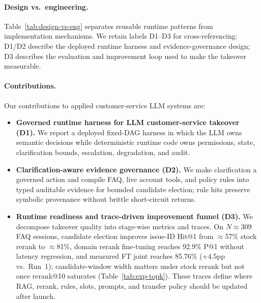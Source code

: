 \documentclass[sigconf,review]{acmart}
\begin{document}
\paragraph{Design vs.\ engineering.}
Table~\ref{tab:design-vs-eng} separates reusable runtime patterns from implementation mechanisms.
We retain labels D1--D3 for cross-referencing: D1/D2 describe the deployed runtime harness and evidence-governance design; D3 describes the evaluation and improvement loop used to make the takeover measurable.

\paragraph{Contributions.}
Our contributions to applied customer-service LLM systems are:
\begin{itemize}[leftmargin=1.2em]
  \item \textbf{Governed runtime harness for LLM customer-service takeover (D1).} We report a deployed fixed-DAG harness in which the LLM owns semantic decisions while deterministic runtime code owns permissions, state, clarification bounds, escalation, degradation, and audit.
  \item \textbf{Clarification-aware evidence governance (D2).} We make clarification a governed action and compile FAQ, live account tools, and policy rules into typed auditable evidence for bounded candidate election; rule hits preserve symbolic provenance without brittle short-circuit returns.
  \item \textbf{Runtime readiness and trace-driven improvement funnel (D3).} We decompose takeover quality into stage-wise metrics and traces. On $N{\approx}309$ FAQ sessions, candidate election improves issue-ID Hit@1 from $\approx$57\% stock rerank to $\approx$81\%, domain rerank fine-tuning reaches 92.9\% P@1 without latency regression, and measured FT joint reaches 85.76\% (+4.5pp vs.\ Run~1); candidate-window width matters under stock rerank but not once rerank@10 saturates (Table~\ref{tab:exp-topk}). These traces define where RAG, rerank, rules, slots, prompts, and transfer policy should be updated after launch.
\end{itemize}
\end{document}
